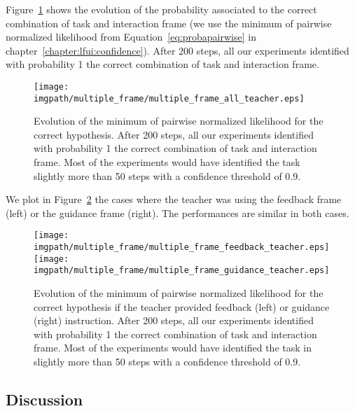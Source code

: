 Figure~\ref{fig:multipleframeall} shows the evolution of the probability associated to the correct combination of task and interaction frame (we use the minimum of pairwise normalized likelihood from Equation~\ref{eq:probapairwise} in chapter~\ref{chapter:lfui:confidence}). After 200 steps, all our experiments identified with probability 1 the correct combination of task and interaction frame. 


\begin{figure}[!htbp]
\centering
\texttt{[image: \\imgpath/multiple\_frame/multiple\_frame\_all\_teacher.eps]}
\caption{Evolution of the minimum of pairwise normalized likelihood for the correct hypothesis. After 200 steps, all our experiments identified with probability 1 the correct combination of task and interaction frame. Most of the experiments would have identified the task slightly more than 50 steps with a confidence threshold of 0.9.}
\label{fig:multipleframeall}
\end{figure} 

We plot in Figure~\ref{fig:multipleframefeedbackvsguidance} the cases where the teacher was using the feedback frame (left) or the guidance frame (right). The performances are similar in both cases.

\begin{figure}[!htbp]
\centering
\texttt{[image: \\imgpath/multiple\_frame/multiple\_frame\_feedback\_teacher.eps]}
\texttt{[image: \\imgpath/multiple\_frame/multiple\_frame\_guidance\_teacher.eps]}
\caption{Evolution of the minimum of pairwise normalized likelihood for the correct hypothesis if the teacher provided feedback (left) or guidance (right) instruction. After 200 steps, all our experiments identified with probability 1 the correct combination of task and interaction frame. Most of the experiments would have identified the task in slightly more than 50 steps with a confidence threshold of 0.9.}
\label{fig:multipleframefeedbackvsguidance}
\end{figure}

\visuopti{\newpage}

\subsection{Discussion}

